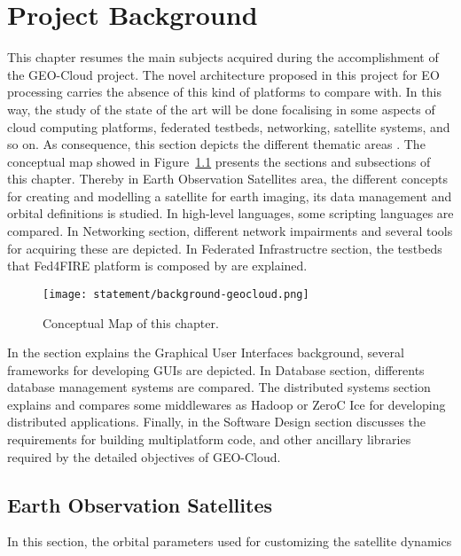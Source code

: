 \chapter{Project Background}
\label{chap:antecedentes}


This chapter resumes the main subjects acquired during the accomplishment of the GEO-Cloud project.  The novel architecture proposed in this project for EO processing carries the absence of this kind of platforms to compare with. In this way, the study of the state of the art will be done focalising in some aspects of cloud computing platforms, federated testbeds, networking, satellite systems, and so on. As consequence, this section depicts the different thematic areas . 
The conceptual map showed in Figure~\ref{fig:intr-conceptual-map} presents the sections and subsections of this chapter. Thereby in Earth Observation Satellites area, the different concepts for creating and modelling a satellite for earth imaging, its data management and orbital definitions is studied. In high-level languages, some scripting languages are compared. In Networking section, different network impairments and several tools for acquiring these are depicted. In Federated Infrastructre section, the testbeds that Fed4FIRE platform is composed by are explained. 

\begin{figure}[!h]
\begin{center}
\texttt{[image: statement/background-geocloud.png]}
\caption{Conceptual Map of this chapter.}
\label{fig:intr-conceptual-map}
\end{center}
\end{figure}

In the section explains the Graphical User Interfaces background, several
frameworks for developing GUIs are depicted. In Database section, differents
database management systems are compared. The distributed systems section
explains and compares some middlewares as Hadoop or ZeroC Ice for developing
distributed applications.
Finally, in the Software Design section discusses the requirements for building multiplatform code, and other ancillary libraries required by the detailed objectives of GEO-Cloud.

\section{Earth Observation Satellites}

In this section, the orbital parameters used for customizing the satellite
dynamics 

